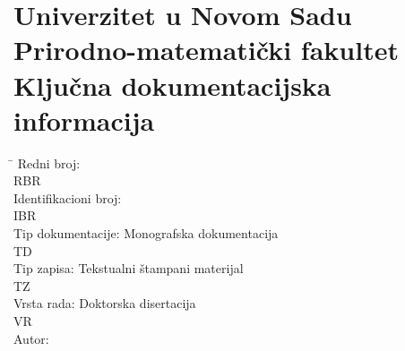 \setcounter{allpages}{\value{frontmatterpage}}

\setcounter{mainpages}{\totalpages}

\addtocounter{mainpages}{-1}

\addtocounter{allpages}{\value{mainpages}}

\chapter[Ključna dokumentacijska informacija]{\Large Univerzitet u Novom Sadu\\
          Prirodno-matematički fakultet\\
          Ključna dokumentacijska informacija}
 
\noindent
\begin{tabbing}
  \hspace*{.3\textwidth}                                           \= \hspace*{.7\textwidth}        \kill
  Redni broj:                                                      \>                               \\
  RBR                                                              \>                               \\
  Identifikacioni broj:                                            \>                               \\
  IBR                                                              \>                               \\
  Tip dokumentacije:                                               \> Monografska dokumentacija     \\
  TD                                                               \>                               \\
  Tip zapisa:                                                      \> Tekstualni štampani materijal \\
  TZ                                                               \>                               \\
  Vrsta rada:                                                      \> Doktorska disertacija         \\
  VR                                                               \>                               \\
  Autor:                                                           \> \autor                        \\

\end{tabbing}
